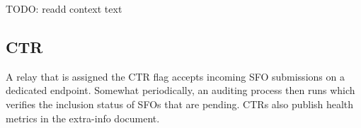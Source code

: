 TODO: readd context text

%

%
%

\subsection{CTR}
A relay that is assigned the CTR flag accepts incoming SFO submissions on a
dedicated endpoint.  Somewhat periodically, an auditing process then runs which
verifies the inclusion status of SFOs that are pending.  CTRs also
publish health metrics in the extra-info document.

